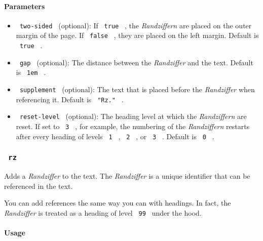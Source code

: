 \paragraph{Parameters}\label{parameters}

\begin{itemize}
\tightlist
\item
  \texttt{\ two-sided\ } (optional): If \texttt{\ true\ } , the
  \emph{Randziffern} are placed on the outer margin of the page. If
  \texttt{\ false\ } , they are placed on the left margin. Default is
  \texttt{\ true\ } .
\item
  \texttt{\ gap\ } (optional): The distance between the
  \emph{Randziffer} and the text. Default is \texttt{\ 1em\ } .
\item
  \texttt{\ supplement\ } (optional): The text that is placed before the
  \emph{Randziffer} when referencing it. Default is \texttt{\ "Rz."\ } .
\item
  \texttt{\ reset-level\ } (optional): The heading level at which the
  \emph{Randziffern} are reset. If set to \texttt{\ 3\ } , for example,
  the numbering of the \emph{Randziffern} restarts after every heading
  of levels \texttt{\ 1\ } , \texttt{\ 2\ } , or \texttt{\ 3\ } .
  Default is \texttt{\ 0\ } .
\end{itemize}

\subsubsection{\texorpdfstring{\texttt{\ rz\ }}{ rz }}\label{rz}

Adds a \emph{Randziffer} to the text. The \emph{Randziffer} is a unique
identifier that can be referenced in the text.

You can add references the same way you can with headings. In fact, the
\emph{Randziffer} is treated as a heading of level \texttt{\ 99\ } under
the hood.

\paragraph{Usage}\label{usage-1}

\begin{Shaded}
\begin{Highlighting}[]

\end{Highlighting}
\end{Shaded}

